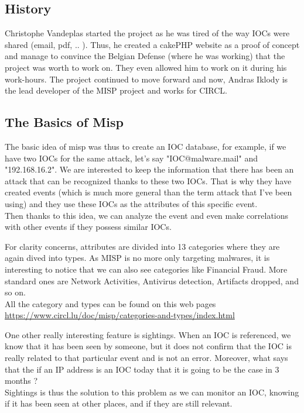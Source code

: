 \documentclass{eplmastersthesis}
\begin{document}
\subsection{History}
Christophe Vandeplas started the project as he was tired of the way IOCs were shared (email, pdf, .. ). Thus, he created a cakePHP website as a proof of concept and manage to convince the Belgian Defense (where he was working) that the project was worth to work on. They even allowed him to work on it during his work-hours. The project continued to move forward and now, Andras Iklody is the lead developer of the MISP project and works for CIRCL.\\

\subsection{The Basics of Misp}
The basic idea of misp was thus to create an IOC database, for example, if we have two IOCs for the same attack, let's say "IOC@malware.mail" and "192.168.16.2". We are interested to  keep the information that there has been an attack that can be recognized thanks to these two IOCs. That is why they have created events (which is much more general than the term attack that I've been using) and they use these IOCs as the attributes of this specific event. \\
Then thanks to this idea, we can analyze the event and even make correlations with other events if they possess similar IOCs.

For clarity concerns, attributes are divided into 13 categories where they are again dived into types. As MISP is no more only targeting malwares, it is interesting to notice that we can also see categories like Financial Fraud. More standard ones are Network Activities, Antivirus detection, Artifacts dropped, and so on.\\
All the category and types can be found on this web pages \url{https://www.circl.lu/doc/misp/categories-and-types/index.html}

One other really interesting feature is sightings. When an IOC is referenced, we know that it has been seen by someone, but it does not confirm that the IOC is really related to that particular event and is not an error. Moreover, what says that the if an IP address is an IOC today that it is going to be the case in 3 months ? \\
Sightings is thus the solution to this problem as we can monitor an IOC, knowing if it has been seen at other places, and if they are still relevant.
\end{document}
